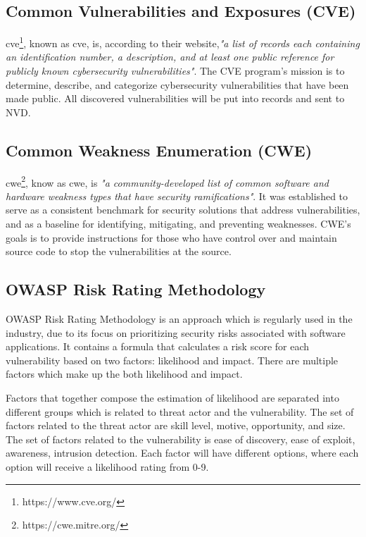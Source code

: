 \subsection{Common Vulnerabilities and Exposures (CVE)}
\acrlong{cve}\footnote{https://www.cve.org/}, known as \acrshort{cve}, is, according to their website,\textit{"a list of records each containing an identification number, a description, and at least one public reference for publicly known cybersecurity vulnerabilities"}\cite{CVE}. The CVE program's mission is to determine, describe, and categorize cybersecurity vulnerabilities that have been made public. All discovered vulnerabilities will be put into records and sent to NVD.

\subsection{Common Weakness Enumeration (CWE)}
\acrlong{cwe}\footnote{https://cwe.mitre.org/}, know as \acrshort{cwe}, is \textit{"a community-developed list of common software and hardware weakness types that have security ramifications"}\cite{CWE}. It was established to serve as a consistent benchmark for security solutions that address vulnerabilities, and as a baseline for identifying, mitigating, and preventing weaknesses. CWE's goals is to provide instructions for those who have control over and maintain source code to stop the vulnerabilities at the source. 

\subsection{OWASP Risk Rating Methodology}
OWASP Risk Rating Methodology is an approach which is regularly used in the industry, due to its focus on prioritizing security risks associated with software applications. It contains a formula  that calculates a risk score for each vulnerability based on two factors: likelihood and impact. There are multiple factors which make up the both likelihood and impact. 

Factors that together compose the estimation of likelihood are separated into different groups which is related to threat actor and the vulnerability. The set of factors related to the threat actor are skill level, motive, opportunity, and size. The set of factors related to the vulnerability is ease of discovery, ease of exploit, awareness, intrusion detection. Each factor will have different options, where each option will receive a likelihood rating from 0-9. 

